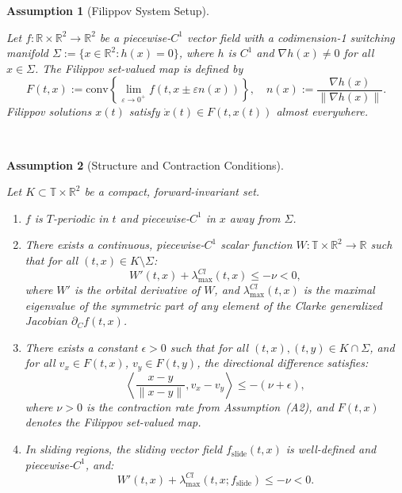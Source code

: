 \documentclass[11pt]{article}
\newtheorem{assumption}{Assumption}
\begin{document}
\begin{assumption}[Filippov System Setup]\label{assump:filippov_system_setup}
	
	Let $f: \mathbb{R} \times \mathbb{R}^2 \to \mathbb{R}^2$ be a piecewise-$C^1$ vector field with a codimension-1 switching manifold $\Sigma := \{ x \in \mathbb{R}^2 : h(x) = 0 \}$, where $h$ is $C^1$ and $\nabla h(x) \neq 0$ for all $x \in \Sigma$. The Filippov set-valued map is defined by
		\begin{equation} \label{eq:filippov_map}
			F(t,x) := \text{conv}\left\{ \lim_{\varepsilon \to 0^+} f(t, x \pm \varepsilon n(x)) \right\}, \quad n(x) := \frac{\nabla h(x)}{\|\nabla h(x)\|}.
		\end{equation}
Filippov solutions $x(t)$ satisfy $\dot{x}(t) \in F(t,x(t))$ almost everywhere.
\end{assumption}
	
\

\begin{assumption}[Structure and Contraction Conditions]\label{assump:structure_contraction}
	
Let $K \subset \mathbb{T} \times \mathbb{R}^2$ be a compact, forward-invariant set.
		\begin{enumerate}
			\item[(A1)] $f$ is $T$-periodic in $t$ and piecewise-$C^1$ in $x$ away from $\Sigma$.
			
			\item[(A2)] There exists a continuous, piecewise-$C^1$ scalar function $W: \mathbb{T} \times \mathbb{R}^2 \to \mathbb{R}$ such that for all $(t,x) \in K \setminus \Sigma$:
			\begin{equation} \label{eq:contraction_smooth}
				W'(t,x) + \lambda_{\max}^{Cl}(t,x) \leq -\nu < 0,
			\end{equation}
			where $W'$ is the orbital derivative of $W$, and $\lambda_{\max}^{Cl}(t,x)$ is the maximal eigenvalue of the symmetric part of any element of the Clarke generalized Jacobian $\partial_C f(t,x)$.
			
		\item[(A3)] There exists a constant \( \epsilon > 0 \) such that for all \( (t, x), (t, y) \in K \cap \Sigma \), and for all \( v_x \in F(t, x) \), \( v_y \in F(t, y) \), the directional difference satisfies:
		\begin{equation} \label{eq:jump_directional_contraction}
			\left\langle \frac{x - y}{\|x - y\|}, v_x - v_y \right\rangle \leq -(\nu + \epsilon),
		\end{equation}
		where \( \nu > 0 \) is the contraction rate from Assumption~(A2), and \( F(t,x) \) denotes the Filippov set-valued map.
			
			\item[(A4)] In sliding regions, the sliding vector field $f_{\text{slide}}(t,x)$ is well-defined and piecewise-$C^1$, and:
			\begin{equation} \label{eq:sliding_contraction}
				W'(t,x) + \lambda_{\max}^{Cl}(t,x; f_{\text{slide}}) \leq -\nu < 0.
			\end{equation}
		\end{enumerate}
	\end{assumption}
\end{document}

